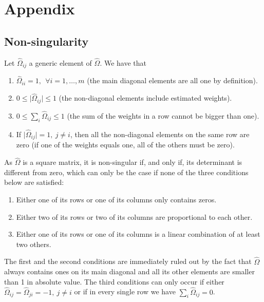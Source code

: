 


\newpage
\appendix

\section{Appendix}

\subsection{Non-singularity}\label{proofns}

Let $\widehat{\Omega}_{ij}$ a generic element of $\widehat{\Omega}$. We have that
\begin{enumerate}
	\item $\widehat{\Omega}_{ii}=1, \ \ \forall i=1,\ldots,m$ (the main diagonal elements are all one by definition).
	\item $0 \leq \vert \widehat{\Omega}_{ij} \vert \leq 1$ (the non-diagonal elements include estimated weights).
	\item $0\leq \sum_{i}  \widehat{\Omega}_{ij} \leq 1$ (the sum of the weights in a row cannot be bigger than one).
	\item If $\vert \widehat{\Omega}_{ij} \vert = 1, \ j \neq i$, then all the non-diagonal elements on the same row are zero (if one of the weights equals one, all of the others must be zero).
\end{enumerate}

As $\widehat{\Omega}$ is a square matrix, it is non-singular if, and only if, its determinant is different from zero, which can only be the case if none of the three conditions below are satisfied:
\begin{enumerate}
	\item Either one of its rows or one of its columns only contains zeros.
	\item Either two of its rows or two of its columns are proportional to each other. 
	\item Either one of its rows or one of its columns is a linear combination of at least two others.
\end{enumerate}

The first and the second conditions are immediately ruled out by the fact that $\widehat{\Omega}$ always contains ones on its main diagonal and all its other elements are smaller than 1 in absolute value. The third conditions can only occur if either  $\widehat{\Omega}_{ij}=\widehat{\Omega}_{ji}=-1,  \ j\neq i$ or if in every single row we have $\sum_{i}  \widehat{\Omega}_{ij} = 0$. 


